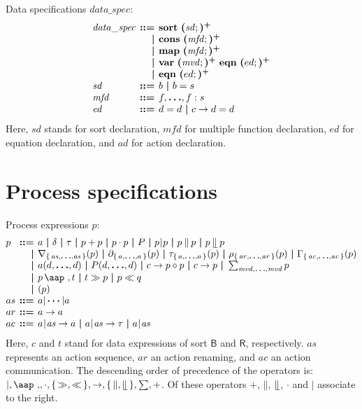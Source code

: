 \documentclass[a4paper,fleqn,10pt]{article}
\makeatletter
\newcommand{\f}[1]{\ensuremath{\mathit{#1}}}
\newcommand{\sbool}{\ensuremath{\mathsf{B}}}
\newcommand{\sreal}{\ensuremath{\mathsf{R}}}
\newenvironment{tightarray}[1]
  {\setlength{\arraycolsep}{2pt}%
   \begin{array}{@{}#1@{}}%
  }
  {\end{array}%
  }
\newcommand{\set}[1]{\ensuremath{\{\,#1\,\}}}
\newcommand{\seq}{\mathbin{\cdot}}
\newcommand{\alt}{\mathbin{+}}
\newcommand{\pmerge}{\mathbin{\parallel}}
\newcommand{\lmerge}{\mathbin{\llfloor}}
\newcommand{\sync}{\mathbin{\!\mid\!}}
\newcommand{\block}[1]{\partial_{#1}}
\newcommand{\hide}[1]{\tau_{#1}}
\newcommand{\ren}[1]{\rho_{#1}}
\newcommand{\allow}[1]{\nabla_{#1}}
\newcommand{\comm}[1]{\Gamma_{#1}}
\newcommand{\at}[1]{\mbox{\aap ,} #1}
\newcommand{\pinit}{\gg}
\newcommand{\pbefore}{\ll}
\newcommand{\mb}[1]{\text{\boldmath$#1$}}
\newcommand{\kwsort}{{\bf sort}}
\newcommand{\kwcons}{{\bf cons}}
\newcommand{\kwmap}{{\bf map}}
\newcommand{\kwvar}{{\bf var}}
\newcommand{\kweqn}{{\bf eqn}}
\makeatother
\begin{document}
Data specifications $\f{data\_spec}$:
\[\begin{tightarray}{lrl}
\f{data\_spec}
& \mb{::=} & \kwsort\ \mb{(}\f{sd};\mb{)^{+}}\\
& \mb{|}   & \kwcons\ \mb{(}\f{mfd};\mb{)^{+}}\\
& \mb{|}   & \kwmap\  \mb{(}\f{mfd};\mb{)^{+}}\\
& \mb{|}   & \kwvar\  \mb{(}\f{mvd};\mb{)^{+}}\ \kweqn\ \mb{(}ed;\mb{)^{+}}\\
& \mb{|}   & \kweqn\  \mb{(}ed;\mb{)^{+}}\\
\f{sd}  & \mb{::=} & b\ \mb{|}\ b = s\\
\f{mfd} & \mb{::=} & f, \mb{\ldots}, f: s\\
\f{ed}  & \mb{::=} & d = d\ \mb{|}\ c \to d = d\\
\end{tightarray}\]
Here, $\f{sd}$ stands for sort declaration,
$\f{mfd}$ for multiple function declaration,
$\f{ed}$ for equation declaration,
and $\f{ad}$ for action declaration.

\section{Process specifications}

Process expressions $p$:
\[\begin{tightarray}{lrl}
p   & \mb{::=} & a\ \mb{|}\ \delta\ \mb{|}\ \tau\ \mb{|}\ p \alt p\ \mb{|}\ p \seq p\ \mb{|}\ P\ \mb{|}\ 
            p \sync p\ \mb{|}\ p \pmerge p\ \mb{|}\ p \lmerge p\\
    & \mb{|} & \allow{\set{\f{as},\mb{\ldots},\f{as}}}(p)\ \mb{|}\ 
            \block{\set{a,\mb{\ldots},a}}(p)\ \mb{|}\ 
            \hide{\set{a,\mb{\ldots},a}}(p)\ \mb{|}\ 
            \ren{\set{\f{ar},\mb{\ldots},\f{ar}}}(p)\ \mb{|}\ 
            \comm{\set{\f{ac},\mb{\ldots},\f{ac}}}(p)\\
    & \mb{|} & a(d, \mb{\ldots}, d)\ \mb{|}\ 
            P(d, \mb{\ldots}, d)\ \mb{|}\ 
            c \to p \diamond p\ \mb{|}\ 
            c \to p\ \mb{|}\  
            \sum_{\f{mvd},\mb{\ldots},\f{mvd}}p\\
     & \mb{|} & p\,\at\,t\ \mb{|}\ t \pinit p\ \mb{|}\ p \pbefore q\\ 
     & \mb{|} & ( p )\\
as  & \mb{::=} & a |\,\mb{\cdots} | a\\
ar  & \mb{::=} & a \to a\\
ac  & \mb{::=} & a\sync\f{as} \to a\ \mb{|}\ a\sync\f{as} \to \tau\ \mb{|}\ a\sync\f{as}\\
\end{tightarray}\]
Here, $c$ and $t$ stand for data expressions of sort $\sbool$ and $\sreal$,
respectively. $\f{as}$ represents an action sequence, $\f{ar}$ an action
renaming, and $\f{ac}$ an action communication. The descending order of
precedence of the operators is: $\mid, \at, \seq, \set{\pinit, \pbefore}, \to,
\set{\pmerge,\lmerge},\sum,\alt$. Of these operators $\alt$, $\pmerge$,
$\lmerge$, $\seq$ and $\mid$ associate to the right.
\end{document}
